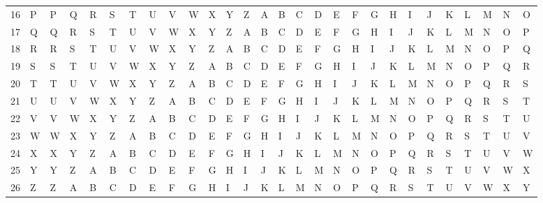 \documentclass[landscape,twocolumn,a4paper]{article}
\begin{document}
{\begin{tabular}{l l| l l l l l l l l l l l l l l l l l l l l l l l l l l}
16 & P & P & Q & R & S & T & U & V & W & X & Y & Z & A & B & C & D & E & F & G & H & I & J & K & L & M & N & O\\
17 & Q & Q & R & S & T & U & V & W & X & Y & Z & A & B & C & D & E & F & G & H & I & J & K & L & M & N & O & P\\
18 & R & R & S & T & U & V & W & X & Y & Z & A & B & C & D & E & F & G & H & I & J & K & L & M & N & O & P & Q\\
19 & S & S & T & U & V & W & X & Y & Z & A & B & C & D & E & F & G & H & I & J & K & L & M & N & O & P & Q & R\\
20 & T & T & U & V & W & X & Y & Z & A & B & C & D & E & F & G & H & I & J & K & L & M & N & O & P & Q & R & S\\
21 & U & U & V & W & X & Y & Z & A & B & C & D & E & F & G & H & I & J & K & L & M & N & O & P & Q & R & S & T\\
22 & V & V & W & X & Y & Z & A & B & C & D & E & F & G & H & I & J & K & L & M & N & O & P & Q & R & S & T & U\\
23 & W & W & X & Y & Z & A & B & C & D & E & F & G & H & I & J & K & L & M & N & O & P & Q & R & S & T & U & V\\
24 & X & X & Y & Z & A & B & C & D & E & F & G & H & I & J & K & L & M & N & O & P & Q & R & S & T & U & V & W\\
25 & Y & Y & Z & A & B & C & D & E & F & G & H & I & J & K & L & M & N & O & P & Q & R & S & T & U & V & W & X\\
26 & Z & Z & A & B & C & D & E & F & G & H & I & J & K & L & M & N & O & P & Q & R & S & T & U & V & W & X & Y\\
\end{tabular}
}
\end{document}
